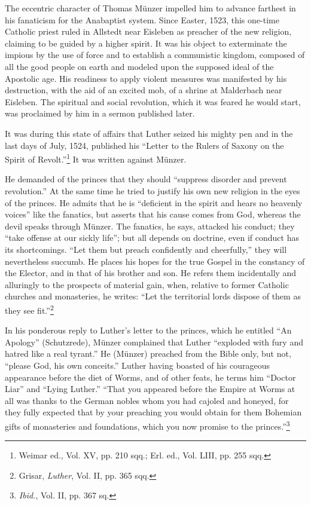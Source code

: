The eccentric character of Thomas Münzer impelled him to advance
farthest in his fanaticism for the Anabaptist system. Since Easter, 1523,
this one-time Catholic priest ruled in Allstedt near Eisleben as preacher
of the new religion, claiming to be guided by a higher spirit. It was his
object to exterminate the impious by the use of force and to establish
a communistic kingdom, composed of all the good people on earth and
modeled upon the supposed ideal of the Apostolic age. His readiness to
apply violent measures was manifested by his destruction, with the aid
of an excited mob, of a shrine at Malderbach near Eisleben. The spiritual
and social revolution, which it was feared he would start, was proclaimed
by him in a sermon published later.

It was during this state of affairs that Luther seized his mighty pen
and in the last days of July, 1524, published his “Letter to the Rulers
of Saxony on the Spirit of Revolt.”\footnote
{Weimar ed., Vol. XV, pp. 210 sqq.; Erl. ed., Vol. LIII, pp. 255 sqq.}
It was written against Münzer.

He demanded of the princes that they should “suppress disorder and
prevent revolution.” At the same time he tried to justify his own new
religion in the eyes of the princes. He admits that he is “deficient in the spirit
and hears no heavenly voices” like the fanatics, but asserts that his cause
comes from God, whereas the devil speaks through Münzer. The fanatics, he
says, attacked his conduct; they “take offense at our sickly life”; but all
depends on doctrine, even if conduct has its shortcomings. “Let them but
preach confidently and cheerfully,” they will nevertheless succumb. He places
his hopes for the true Gospel in the constancy of the Elector, and in that
of his brother and son. He refers them incidentally and alluringly to the
prospects of material gain, when, relative to former Catholic churches and
monasteries, he writes: ``Let the territorial lords dispose of them as they see
fit.''\footnote{Grisar, \textit{Luther}, Vol. II, pp. 365 sqq.}

In his ponderous reply to Luther’s letter to the princes, which he
entitled “An Apology” (Schutzrede), Münzer complained that Luther
“exploded with fury and hatred like a real tyrant.” He (Münzer)
preached from the Bible only, but not, “please God, his own conceits.”
Luther having boasted of his courageous appearance before the diet
of Worms, and of other feats, he terms him “Doctor Liar” and “Lying
Luther.” “That you appeared before the Empire at Worms at all was
thanks to the German nobles whom you had cajoled and honeyed,
for they fully expected that by your preaching you would obtain
for them Bohemian gifts of monasteries and foundations, which you
now promise to the princes.”\footnote{\textit{Ibid.}, Vol. II, pp. 367 sq.}

